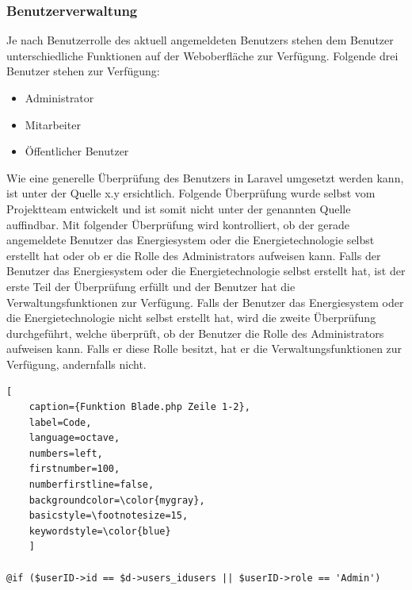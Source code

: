 \newpage
\subsubsection{Benutzerverwaltung}
Je nach Benutzerrolle des aktuell angemeldeten Benutzers stehen dem Benutzer unterschiedliche Funktionen auf der Weboberfläche zur Verfügung.  
Folgende drei Benutzer stehen zur Verfügung:
\begin{itemize}
	\item Administrator 
	\item Mitarbeiter
	\item Öffentlicher Benutzer
\end{itemize}
Wie eine generelle Überprüfung des Benutzers in Laravel umgesetzt werden kann, ist unter der Quelle x.y ersichtlich. Folgende Überprüfung wurde selbst vom Projektteam entwickelt und ist somit nicht unter der genannten Quelle auffindbar.\newline \newline
Mit folgender Überprüfung wird kontrolliert, ob der gerade angemeldete Benutzer das Energiesystem oder die Energietechnologie selbst erstellt hat oder ob er die Rolle des Administrators aufweisen kann. Falls der Benutzer das Energiesystem oder die Energietechnologie selbst erstellt hat, ist der erste Teil der Überprüfung erfüllt und der Benutzer hat die Verwaltungsfunktionen zur Verfügung. Falls der Benutzer das Energiesystem oder die Energietechnologie nicht selbst erstellt hat, wird die zweite Überprüfung durchgeführt, welche überprüft, ob der Benutzer die Rolle des Administrators aufweisen kann. Falls er diese Rolle besitzt, hat er die Verwaltungsfunktionen zur Verfügung, andernfalls nicht.


\begin{lstlisting}[
	caption={Funktion Blade.php Zeile 1-2},
	label=Code,
	language=octave,
	numbers=left,
	firstnumber=100,
	numberfirstline=false,
	backgroundcolor=\color{mygray},
	basicstyle=\footnotesize=15,
	keywordstyle=\color{blue}
	]
	
@if ($userID->id == $d->users_idusers || $userID->role == 'Admin')

	
\end{lstlisting}





